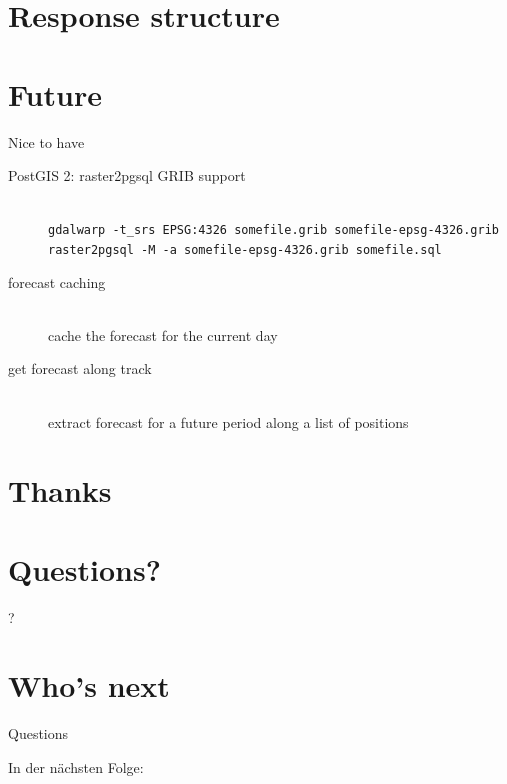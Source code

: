 \documentclass[xcolor=svgnames]{beamer}
\begin{document}
\section{Response structure}

    \begin{frame}
    \end{frame}

\section{Future}

    \begin{frame}{Nice to have}
        \begin{description}
            \item[PostGIS 2: raster2pgsql GRIB support]~\\
                    \texttt{gdalwarp -t\_srs EPSG:4326 somefile.grib somefile-epsg-4326.grib}\\
                    \texttt{raster2pgsql -M -a somefile-epsg-4326.grib somefile.sql}

            \item[forecast caching]~\\cache the forecast for the current day
            \item[get forecast along track]~\\extract forecast for a future period along a list of positions
        \end{description}
    \end{frame}

\section{Thanks}

    \begin{frame}
    \end{frame}

\section{Questions?}

    \begin{frame}
        \begin{center}
            \Huge{?}
        \end{center}
    \end{frame}

\section{Who's next}

    \begin{frame}{Questions}
        \begin{center}
            \Huge{In der nächsten Folge:}\\
        \end{center}
    \end{frame}
\end{document}
